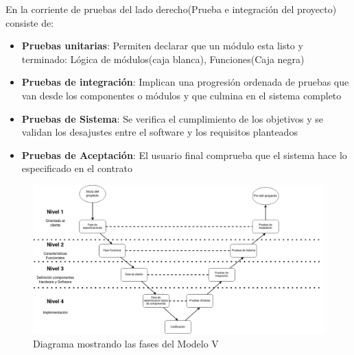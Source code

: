 \hfill \break
\justifying
En la corriente de pruebas del lado derecho(Prueba e integración del proyecto) consiste de:
\begin{itemize}
	\item \textbf{Pruebas unitarias}: Permiten declarar que un módulo esta listo y terminado: Lógica de módulos(caja blanca), Funciones(Caja negra)
	\item \textbf{Pruebas de integración}: Implican una progresión ordenada de pruebas que van desde los componentes o módulos y que culmina en el sistema completo
	\item \textbf{Pruebas de Sistema}: Se verifica el cumplimiento de los objetivos y se validan los desajustes entre el software y los requisitos planteados
	\item \textbf{Pruebas de Aceptación}: El usuario final comprueba que el sistema hace lo especificado en el contrato
\end{itemize}


\begin{figure}[!h]
	\centering
	\includegraphics[width=16cm]{Imagenes/Modelo_V.png}
	\caption{Diagrama mostrando las fases del Modelo V}
	\label{Modelo_V}
\end{figure}